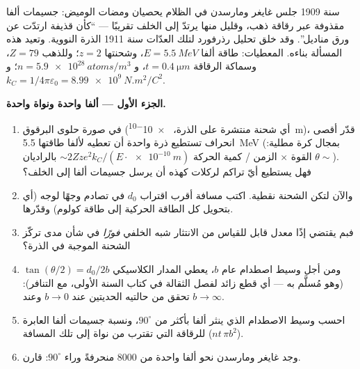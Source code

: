 \begin{problem}\label{pb:b3:scattering-theory:1}
سنة 1909 جلس غايغر ومارسدن في الظلام يحصيان ومضات
الوميض: جسيمات ألفا مقذوفة عبر رقاقة ذهب، وقليل منها يرتدّ
إلى الخلف تقريبًا --- ``كأن قذيفة ارتدّت عن ورق
مناديل''. وقد خلق تحليل رذرفورد لتلك العدّات سنة 1911
الذرة النووية. وتعيد هذه المسألة بناءه. المعطيات: طاقة ألفا $E =
\qty{5.5}{MeV}$، وشحنتها $z = 2$؛ وللذهب $Z = 79$، وسماكة الرقاقة $t
= \qty{0.4}{\micro m}$، و $n = \qty{5.9e28}{atoms/m^3}$؛ و $k_C =
1/4\pi\varepsilon_0 = \qty{8.99e9}{N.m^2/C^2}$.

\medskip\noindent\textbf{الجزء الأول --- ألفا واحدة ونواة واحدة.}
\begin{enumerate}
  \item في صورة حلوى البرقوق (أي شحنة منتشرة على الذرة،
        \qty{e-10}{m})، قدّر أقصى انحراف تستطيع ذرة
        واحدة أن تعطيه لألفا طاقتها \qty{5.5}{MeV} (بمجال كرة
        مطلية: $\theta \sim$ القوة $\times$ الزمن / كمية الحركة
        $\sim 2Zze^2k_C/(E\cdot\qty{e-10}{m})$ بالراديان). فهل يستطيع
        أيّ تراكم لركلات كهذه أن يرسل جسيمات ألفا إلى الخلف؟
  \item والآن لتكن الشحنة نقطية. اكتب مسافة أقرب
        اقتراب $d_0$ في تصادم وجهًا لوجه (أي بتحويل كل الطاقة
        الحركية إلى طاقة كولوم) وقدّرها.
  \item فبم يقتضي إذًا معدل قابل للقياس من الانتثار شبه الخلفي
        \emph{فورًا} في شأن مدى تركّز الشحنة الموجبة
        في الذرة؟
  \item ومن أجل وسيط اصطدام عام $b$، يعطي المدار الكلاسيكي
        $\tan(\theta/2) = d_0/2b$ (وهو مُسلَّم به --- أي
        قطع زائد لفصل الثقالة في كتاب السنة الأولى، مع
        التنافر): تحقق من حالتيه الحديتين عند $b \to 0$ وعند $b \to
        \infty$.
  \item احسب وسيط الاصطدام الذي ينثر ألفا بأكثر
        من $90^\circ$، ونسبة جسيمات ألفا العابرة
        للرقاقة التي تقترب من نواة إلى تلك المسافة ($n t\,\pi
        b^2$).
  \item وجد غايغر ومارسدن نحو ألفا واحدة من 8000 منحرفةً
        وراء $90^\circ$: قارن.
\end{enumerate}


\end{problem}
